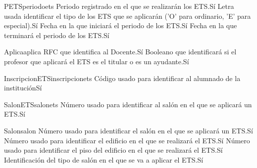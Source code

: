 \begin{cdtEntidad}{PETS}{periodoets}
	{Periodo registrado en el que se realizarán los ETS.}{Sí}
	{Letra usada identificar el tipo de los ETS que se aplicarán ('O' para ordinario, 'E' para especial).}{Sí}
	{Fecha en la que iniciará el periodo de los ETS.}{Sí}
	{Fecha en la que terminará el periodo de los ETS.}{Sí}
\end{cdtEntidad}
\begin{cdtEntidad}{Aplica}{aplica}
	{RFC que identifica al Docente.}{Sí}
	{Booleano que identificará si el profesor que aplicará el ETS es el titular o es un ayudante.}{Sí}
\end{cdtEntidad}
\begin{cdtEntidad}{InscripcionETS}{inscripcionets}
	{Código usado para identificar al alumnado de la institución}{Sí}
\end{cdtEntidad}
\begin{cdtEntidad}{SalonETS}{salonets}
	{Número usado para identificar al salón en el que se aplicará un ETS.}{Sí}
\end{cdtEntidad}
\begin{cdtEntidad}{Salon}{salon}
	{Número usado para identificar el salón en el que se aplicará un ETS.}{Sí}
	{Número usado para identificar el edificio en el que se realizará el ETS.}{Sí}
	{Número usado para identificar el piso del edificio en el que se realizará el ETS.}{Sí}
	{Identificación del tipo de salón en el que se va a aplicar el ETS.}{Sí}
\end{cdtEntidad}

